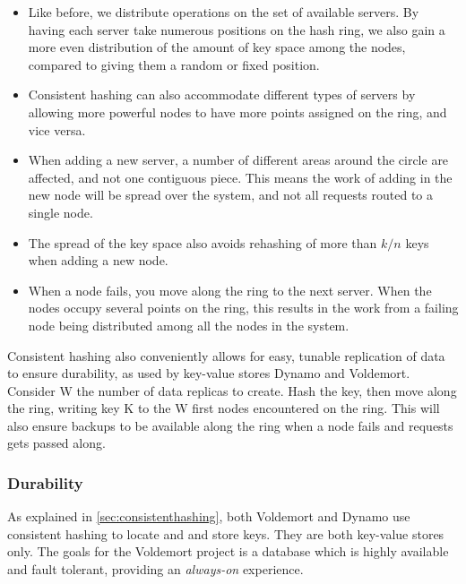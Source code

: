 \begin{itemize}
\item Like before, we distribute operations on the set of available servers. By having each server take numerous positions on the hash ring, we also gain a more even distribution of the amount of key space among the nodes, compared to giving them a random or fixed position.

\item Consistent hashing can also accommodate different types of servers by allowing more powerful nodes to have more points assigned on the ring, and vice versa. 

\item When adding a new server, a number of different areas around the circle are affected, and not one contiguous piece. This means the work of adding in the new node will be spread over the system, and not all requests routed to a single node.

\item The spread of the key space also avoids rehashing of more than $k/n$ keys when adding a new node. 

\item When a node fails, you move along the ring to the next server. When the nodes occupy several points on the ring, this results in the work from a failing node being distributed among all the nodes in the system.
\end{itemize}

Consistent hashing also conveniently allows for easy, tunable replication of data to ensure durability, as used by key-value stores Dynamo\cite{dynamo} and Voldemort\cite{voldemort}. Consider W the number of data replicas to create. Hash the key, then move along the ring, writing key K to the W first nodes encountered on the ring. This will also ensure backups to be available along the ring when a node fails and requests gets passed along.

\subsubsection{Durability}
As explained in \ref{sec:consistenthashing}, both Voldemort and Dynamo use consistent hashing to locate and and store keys.
They are both key-value stores only.
The goals for the Voldemort project is a database which is highly available and fault tolerant, providing an \emph{always-on} experience.

